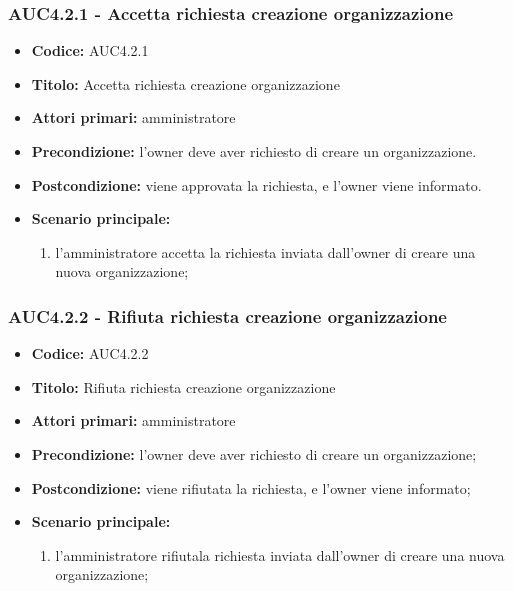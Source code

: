 \documentclass[casi-duso]{subfiles}
\begin{document}
\subsubsection{AUC4.2.1 - Accetta richiesta creazione organizzazione}%
\label{subsub:AUC4.2.1}
\begin{itemize}
  \item \textbf{Codice:} AUC4.2.1
  \item \textbf{Titolo:} Accetta richiesta creazione organizzazione
  \item \textbf{Attori primari:} amministratore
  \item \textbf{Precondizione:} l'owner deve aver richiesto di creare un organizzazione.
  \item \textbf{Postcondizione:} viene approvata la richiesta, e l'owner viene informato.
  \item \textbf{Scenario principale:}
  \begin{enumerate}
    \item  l'amministratore accetta la richiesta inviata dall'owner di creare una nuova organizzazione;
  \end{enumerate}
\end{itemize}

\subsubsection{AUC4.2.2 - Rifiuta richiesta creazione organizzazione}%
\label{subsub:AUC4.2.2}
\begin{itemize}
  \item \textbf{Codice:} AUC4.2.2
  \item \textbf{Titolo:} Rifiuta richiesta creazione organizzazione
  \item \textbf{Attori primari:} amministratore
  \item \textbf{Precondizione:} l'owner deve aver richiesto di creare un organizzazione;
  \item \textbf{Postcondizione:} viene rifiutata la richiesta, e l'owner viene informato;
  \item \textbf{Scenario principale:}
  \begin{enumerate}
    \item  l'amministratore rifiutala richiesta inviata dall'owner di creare una nuova organizzazione;
  \end{enumerate}
\end{itemize}
\end{document}
